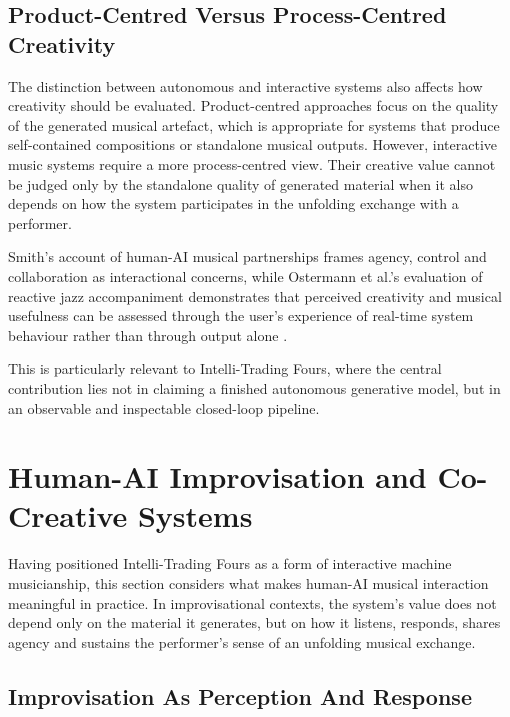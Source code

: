 \subsection{Product-Centred Versus Process-Centred Creativity}\label{product-centred-versus-process-centred-creativity}

The distinction between autonomous and interactive systems also affects
how creativity should be evaluated. Product-centred approaches focus on
the quality of the generated musical artefact, which is appropriate for
systems that produce self-contained compositions or standalone musical
outputs. However, interactive music systems require a more
process-centred view. Their creative value cannot be judged only by the
standalone quality of generated material when it also depends on how the
system participates in the unfolding exchange with a performer.

Smith's account of human-AI musical partnerships frames agency, control
and collaboration as interactional concerns, while Ostermann et al.'s
evaluation of reactive jazz accompaniment demonstrates that perceived
creativity and musical usefulness can be assessed through the user's
experience of real-time system behaviour rather than through output
alone \citep{smith2022humanai,ostermann2021evaluating}.

This is particularly relevant to Intelli-Trading Fours, where the
central contribution lies not in claiming a finished autonomous
generative model, but in an observable and inspectable closed-loop
pipeline.

\section{Human-AI Improvisation and Co-Creative Systems}\label{human-ai-improvisation-and-co-creative-systems}

Having positioned Intelli-Trading Fours as a form of interactive machine
musicianship, this section considers what makes human-AI musical
interaction meaningful in practice. In improvisational contexts, the
system's value does not depend only on the material it generates, but on
how it listens, responds, shares agency and sustains the performer's
sense of an unfolding musical exchange.

\subsection{Improvisation As Perception And Response}\label{improvisation-as-perception-and-response}

